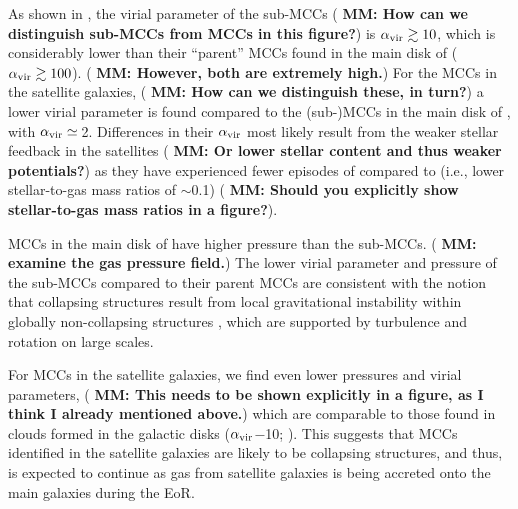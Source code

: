 \IfFileExists{emulateapjlegacy.cls}{\documentclass[iop]{emulateapjlegacy}}{\documentclass[iop]{emulateapj}}
\newcommand{\MM}[1]{({\bf \color{mmcolor} MM: #1})}
\begin{document}

As shown in ,
the virial parameter of the sub-MCCs \MM{How can we distinguish
  sub-MCCs from MCCs in this figure?} is $\alpha_{\rm vir}\gtrsim10$,
which is considerably lower than their ``parent'' MCCs found in the
main disk of \flower ($\alpha_{\rm vir}\gtrsim100$).  \MM{However,
  both are extremely high.}
%
For the MCCs in the satellite galaxies, \MM{How can we distinguish
  these, in turn?} a lower virial parameter is found compared to the (sub-)MCCs in the main disk of \flower, with $\alpha_{\rm vir}\simeq$\,2.
Differences in their $\alpha_{\rm vir}$ most likely result from the
weaker stellar feedback in the satellites \MM{Or lower stellar content
and thus weaker potentials?} as they have experienced fewer episodes
of \SF compared to \flower (i.e., lower stellar-to-gas mass ratios of
$\sim$0.1) \MM{Should you explicitly show stellar-to-gas mass ratios in a figure?}.

MCCs in the main disk of \flower have higher pressure than the
sub-MCCs. \MM{examine the gas pressure field.} The lower virial parameter and 
pressure of the sub-MCCs compared to their parent MCCs are consistent with the notion that collapsing structures result from local gravitational instability within globally non-collapsing structures \citep[see e.g.,][]{Ballesteros-Paredes11a}, which are supported by turbulence and rotation on large scales.

For MCCs in the satellite galaxies, we find even lower pressures and
virial parameters, \MM{This needs to be shown explicitly in a figure,
  as I think I already mentioned above.} which are comparable to those found in clouds formed in the galactic disks  ($\alpha_{\rm vir}$$-$10; \citealt{Dobbs08a, Tasker09a}).
This suggests that MCCs identified in the satellite galaxies are likely to be collapsing structures, and thus, \SF is expected to continue as gas from satellite galaxies is being accreted onto the main galaxies during the EoR.
\end{document}
